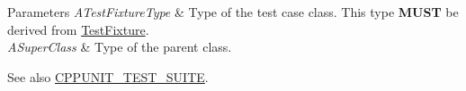\begin{DoxyParams}{Parameters}
{\em A\+Test\+Fixture\+Type} & Type of the test case class. This type {\bfseries M\+U\+ST} be derived from \hyperlink{class_test_fixture}{Test\+Fixture}. \\
\hline
{\em A\+Super\+Class} & Type of the parent class. \\
\hline
\end{DoxyParams}
\begin{DoxySeeAlso}{See also}
\hyperlink{group___writing_test_fixture_gaef6ae7648fa961600921b6c004f39933}{C\+P\+P\+U\+N\+I\+T\+\_\+\+T\+E\+S\+T\+\_\+\+S\+U\+I\+TE}. 
\end{DoxySeeAlso}
